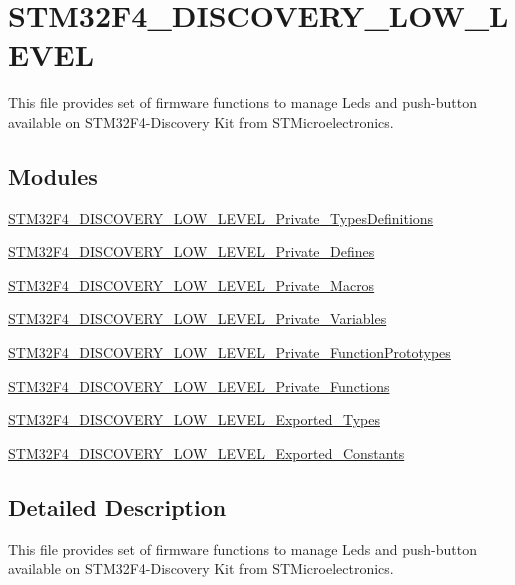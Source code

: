 \hypertarget{group___s_t_m32_f4___d_i_s_c_o_v_e_r_y___l_o_w___l_e_v_e_l}{}\section{S\+T\+M32\+F4\+\_\+\+D\+I\+S\+C\+O\+V\+E\+R\+Y\+\_\+\+L\+O\+W\+\_\+\+L\+E\+V\+E\+L}
\label{group___s_t_m32_f4___d_i_s_c_o_v_e_r_y___l_o_w___l_e_v_e_l}


This file provides set of firmware functions to manage Leds and push-\/button available on S\+T\+M32\+F4-\/\+Discovery Kit from S\+T\+Microelectronics.  


\subsection*{Modules}
\begin{DoxyCompactItemize}
\item 
\hyperlink{group___s_t_m32_f4___d_i_s_c_o_v_e_r_y___l_o_w___l_e_v_e_l___private___types_definitions}{S\+T\+M32\+F4\+\_\+\+D\+I\+S\+C\+O\+V\+E\+R\+Y\+\_\+\+L\+O\+W\+\_\+\+L\+E\+V\+E\+L\+\_\+\+Private\+\_\+\+Types\+Definitions}
\item 
\hyperlink{group___s_t_m32_f4___d_i_s_c_o_v_e_r_y___l_o_w___l_e_v_e_l___private___defines}{S\+T\+M32\+F4\+\_\+\+D\+I\+S\+C\+O\+V\+E\+R\+Y\+\_\+\+L\+O\+W\+\_\+\+L\+E\+V\+E\+L\+\_\+\+Private\+\_\+\+Defines}
\item 
\hyperlink{group___s_t_m32_f4___d_i_s_c_o_v_e_r_y___l_o_w___l_e_v_e_l___private___macros}{S\+T\+M32\+F4\+\_\+\+D\+I\+S\+C\+O\+V\+E\+R\+Y\+\_\+\+L\+O\+W\+\_\+\+L\+E\+V\+E\+L\+\_\+\+Private\+\_\+\+Macros}
\item 
\hyperlink{group___s_t_m32_f4___d_i_s_c_o_v_e_r_y___l_o_w___l_e_v_e_l___private___variables}{S\+T\+M32\+F4\+\_\+\+D\+I\+S\+C\+O\+V\+E\+R\+Y\+\_\+\+L\+O\+W\+\_\+\+L\+E\+V\+E\+L\+\_\+\+Private\+\_\+\+Variables}
\item 
\hyperlink{group___s_t_m32_f4___d_i_s_c_o_v_e_r_y___l_o_w___l_e_v_e_l___private___function_prototypes}{S\+T\+M32\+F4\+\_\+\+D\+I\+S\+C\+O\+V\+E\+R\+Y\+\_\+\+L\+O\+W\+\_\+\+L\+E\+V\+E\+L\+\_\+\+Private\+\_\+\+Function\+Prototypes}
\item 
\hyperlink{group___s_t_m32_f4___d_i_s_c_o_v_e_r_y___l_o_w___l_e_v_e_l___private___functions}{S\+T\+M32\+F4\+\_\+\+D\+I\+S\+C\+O\+V\+E\+R\+Y\+\_\+\+L\+O\+W\+\_\+\+L\+E\+V\+E\+L\+\_\+\+Private\+\_\+\+Functions}
\item 
\hyperlink{group___s_t_m32_f4___d_i_s_c_o_v_e_r_y___l_o_w___l_e_v_e_l___exported___types}{S\+T\+M32\+F4\+\_\+\+D\+I\+S\+C\+O\+V\+E\+R\+Y\+\_\+\+L\+O\+W\+\_\+\+L\+E\+V\+E\+L\+\_\+\+Exported\+\_\+\+Types}
\item 
\hyperlink{group___s_t_m32_f4___d_i_s_c_o_v_e_r_y___l_o_w___l_e_v_e_l___exported___constants}{S\+T\+M32\+F4\+\_\+\+D\+I\+S\+C\+O\+V\+E\+R\+Y\+\_\+\+L\+O\+W\+\_\+\+L\+E\+V\+E\+L\+\_\+\+Exported\+\_\+\+Constants}
\end{DoxyCompactItemize}


\subsection{Detailed Description}
This file provides set of firmware functions to manage Leds and push-\/button available on S\+T\+M32\+F4-\/\+Discovery Kit from S\+T\+Microelectronics. 


